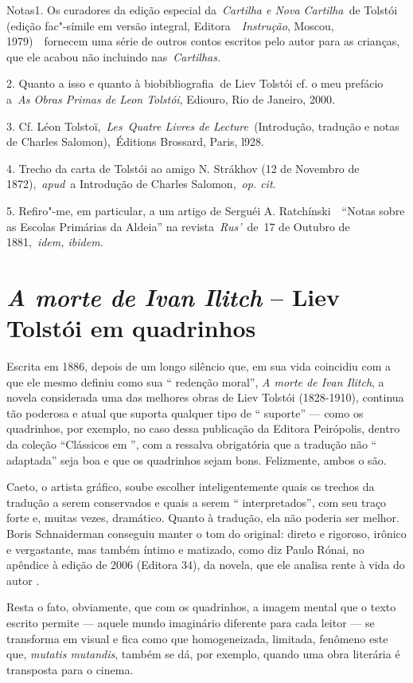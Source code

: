 Notas1. Os curadores da edição especial da~\emph{Cartilha e Nova
Cartilha~}de  Tolstói (edição fac"-símile em versão integral,
Editora~~\emph{Instrução}, Moscou, 1979)~~fornecem uma série de outros
contos escritos pelo autor para as crianças, que ele acabou não
incluindo nas~\emph{Cartilhas.}

2. Quanto a isso e quanto à biobibliografia\textbf{~}de Liev Tolstói cf.
o meu prefácio a~\emph{As Obras Primas de Leon Tolstói}, Ediouro, Rio de
Janeiro, 2000.~

3. Cf. Léon Tolstoï,~\emph{Les}~\emph{Quatre Livres de
Lecture~}(Introdução, tradução e notas de Charles Salomon),~Éditions
Brossard, Paris, l928.

4. Trecho da carta de Tolstói ao amigo N. Strákhov (12 de Novembro de
1872),~\emph{apud}~a Introdução de Charles Salomon,~\emph{op. cit.}

5. Refiro"-me, em particular, a um artigo de Serguéi A.
Ratchínski~~``Notas sobre as Escolas Primárias da Aldeia'' na
revista~\emph{Rus'}~de~17 de Outubro de 1881,~\emph{idem, ibidem}.

\chapter{\emph{A morte de Ivan Ilitch} -- Liev Tolstói em quadrinhos}

Escrita em 1886, depois de um longo silêncio que, em sua vida coincidiu
com a que ele mesmo definiu como sua `` redenção moral'', \emph{A morte
de Ivan Ilitch}, a novela considerada uma das melhores obras de Liev
Tolstói (1828-1910), continua tão poderosa e atual que suporta qualquer
tipo de `` suporte'' --- como os quadrinhos, por exemplo, no caso dessa
publicação da Editora Peirópolis, dentro da coleção ``Clássicos em
'', com a ressalva obrigatória que a tradução não `` adaptada'' seja
boa e que os quadrinhos sejam bons. Felizmente, ambos o são.

Caeto, o artista gráfico, soube escolher inteligentemente quais os
trechos da tradução a serem conservados e quais a serem ``
interpretados'', com seu traço forte e, muitas vezes, dramático. Quanto
à tradução, ela não poderia ser melhor. Boris Schnaiderman conseguiu
manter o tom do original: direto e rigoroso, irônico e vergastante, mas
também íntimo e matizado, como diz Paulo Rónai, no apêndice à edição de
2006 (Editora 34), da novela, que ele analisa rente à vida do autor .

Resta o fato, obviamente, que com os quadrinhos, a imagem mental que o
texto escrito permite --- aquele mundo imaginário diferente para cada
leitor --- se transforma em visual e fica como que homogeneizada,
limitada, fenômeno este que, \emph{mutatis mutandis}, também se dá, por
exemplo, quando uma obra literária é transposta para o cinema.

